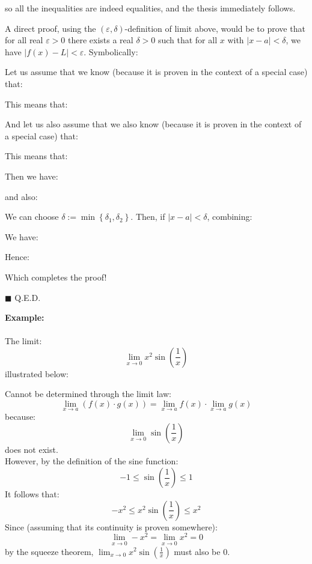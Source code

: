 	so all the inequalities are indeed equalities, and the thesis immediately follows.
	\begin{dem}
	A direct proof, using the $(\varepsilon, \delta)$-definition of limit above, would be to prove that for all real $\varepsilon>0$ there exists a real $\delta> 0$ such that for all $x$ with $|x-a|<\delta$, we have $|f(x)-L|<\varepsilon$. Symbolically:
	
	Let us assume that we know (because it is proven in the context of a special case) that:
	
	This means that:
	
	And let us also assume that we also know (because it is proven in the context of a special case) that:
	
	This means that:
	
	Then we have:
	
	and also:
	
	We can choose $\delta:=\min \left\{\delta_1, \delta_2\right\}$. Then, if $|x-a|<\delta$, combining:
	
	We have:
	
	Hence:
	
	Which completes the proof!
	\begin{flushright}
		$\blacksquare$  Q.E.D.
	\end{flushright}
	\end{dem}
	
	\begin{tcolorbox}[colframe=black,colback=white,sharp corners,breakable]
	\textbf{{\Large {}}Example:}\\\\
	The limit:
	$$
	\lim _{x \rightarrow 0} x^2 \sin \left(\frac{1}{x}\right)
	$$
	illustrated below:
	\begin{figure}[H]
		\centering
	\end{figure}
	Cannot be determined through the limit law:
	$$
	\lim _{x \rightarrow a}(f(x) \cdot g(x))=\lim _{x \rightarrow a} f(x) \cdot \lim _{x \rightarrow a} g(x)
	$$
	because:
	$$
	\lim _{x \rightarrow 0} \sin \left(\frac{1}{x}\right)
	$$
	does not exist.\\
	
	However, by the definition of the sine function:
	$$
	-1 \leq \sin \left(\frac{1}{x}\right) \leq 1
	$$
	It follows that:
	$$
	-x^2 \leq x^2 \sin \left(\frac{1}{x}\right) \leq x^2
	$$
	Since (assuming that its continuity is proven somewhere):
	$$\lim _{x \rightarrow 0}-x^2=\lim _{x \rightarrow 0} x^2=0$$
	by the squeeze theorem, $\lim _{x \rightarrow 0} x^2 \sin \left(\frac{1}{x}\right)$ must also be $0$.
	\end{tcolorbox}
	
